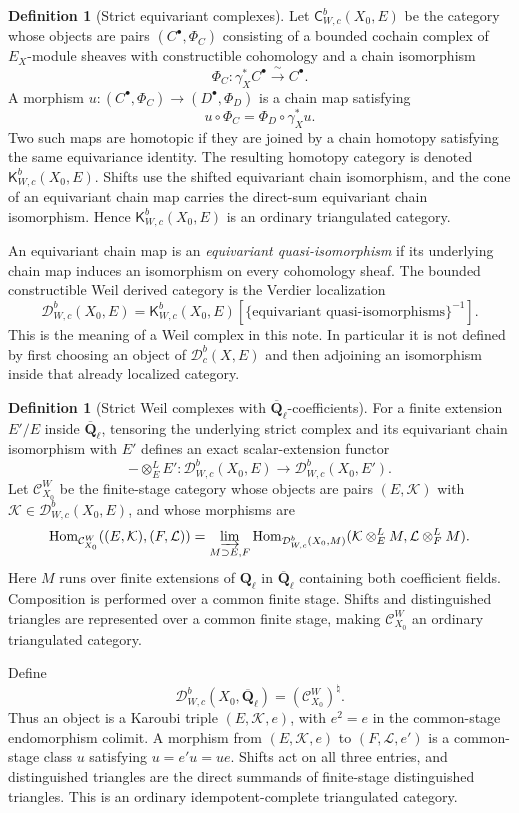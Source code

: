 \documentclass[10pt]{article}
\theoremstyle{definition}
\newtheorem{definition}[theorem]{Definition}
\newcommand{\Ql}{\mathbf Q_\ell}
\newcommand{\Qlb}{\overline{\mathbf Q}_\ell}
\newcommand{\Dbc}{\mathcal D^b_c}
\begin{document}
\begin{definition}[Strict equivariant complexes]
Let \(\mathsf C^b_{W,c}(X_0,E)\) be the category whose objects are pairs
\((C^\bullet,\Phi_C)\) consisting of a bounded cochain complex of
\(E_X\)-module sheaves with constructible cohomology and a chain
isomorphism
\[
 \Phi_C:\gamma_X^*C^\bullet\xrightarrow{\ \sim\ }C^\bullet.
\]
A morphism
\(u:(C^\bullet,\Phi_C)\to(D^\bullet,\Phi_D)\) is a chain map satisfying
\[
 u\circ\Phi_C=\Phi_D\circ\gamma_X^*u.
\]
Two such maps are homotopic if they are joined by a chain homotopy satisfying
the same equivariance identity.  The resulting homotopy category is denoted
\(\mathsf K^b_{W,c}(X_0,E)\).  Shifts use the shifted equivariant chain
isomorphism, and the cone of an equivariant chain map carries the direct-sum
equivariant chain isomorphism.  Hence \(\mathsf K^b_{W,c}(X_0,E)\) is an
ordinary triangulated category.

An equivariant chain map is an \emph{equivariant quasi-isomorphism} if its
underlying chain map induces an isomorphism on every cohomology sheaf.  The
bounded constructible Weil derived category is the Verdier localization
\[
 \mathcal D^b_{W,c}(X_0,E)
 =\mathsf K^b_{W,c}(X_0,E)
  [\{\text{equivariant quasi-isomorphisms}\}^{-1}].
\]
This is the meaning of a Weil complex in this note.  In particular it is not
defined by first choosing an object of \(\Dbc(X,E)\) and then adjoining an
isomorphism inside that already localized category.
\end{definition}

\begin{definition}[Strict Weil complexes with \(\Qlb\)-coefficients]
For a finite extension \(E'/E\) inside \(\Qlb\), tensoring the underlying
strict complex and its equivariant chain isomorphism with \(E'\) defines an
exact scalar-extension functor
\[
 -\otimes_E^LE':\mathcal D^b_{W,c}(X_0,E)
 \longrightarrow\mathcal D^b_{W,c}(X_0,E').
\]
Let \(\mathcal C^W_{X_0}\) be the finite-stage category whose objects are
pairs \((E,\mathcal K)\) with
\(\mathcal K\in\mathcal D^b_{W,c}(X_0,E)\), and whose morphisms are
\[
 \operatorname{Hom}_{\mathcal C^W_{X_0}}
 ((E,\mathcal K),(F,\mathcal L))
 =\varinjlim_{M\supset E,F}
 \operatorname{Hom}_{\mathcal D^b_{W,c}(X_0,M)}
 (\mathcal K\otimes_E^LM,\mathcal L\otimes_F^LM).
\]
Here \(M\) runs over finite extensions of \(\Ql\) in \(\Qlb\) containing
both coefficient fields.  Composition is performed over a common finite
stage.  Shifts and distinguished triangles are represented over a common
finite stage, making \(\mathcal C^W_{X_0}\) an ordinary triangulated
category.

Define
\[
 \mathcal D^b_{W,c}(X_0,\Qlb)=(\mathcal C^W_{X_0})^\natural.
\]
Thus an object is a Karoubi triple \((E,\mathcal K,e)\), with
\(e^2=e\) in the common-stage endomorphism colimit.  A morphism from
\((E,\mathcal K,e)\) to \((F,\mathcal L,e')\) is a common-stage class
\(u\) satisfying \(u=e'u=ue\).  Shifts act on all three entries, and
distinguished triangles are the direct summands of finite-stage
distinguished triangles.  This is an ordinary idempotent-complete
triangulated category.
\end{definition}
\end{document}
